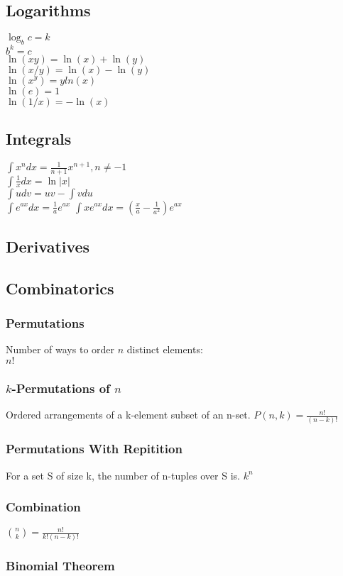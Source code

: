 \subsection*{Logarithms}
$\log_b c=k$\\
$b^k=c$\\
$\ln(xy)=\ln(x)+\ln(y)$\\
$\ln(x/y)=\ln(x)-\ln(y)$\\
$\ln(x^y)=yln(x)$\\
$\ln(e)=1$\\
$\ln(1/x)=-\ln(x)$

\subsection*{Integrals}
$\int x^n dx = \frac{1}{n+1}x^{n+1},n\neq-1$\\
$\int \frac{1}{x} dx = \ln|x|$\\
$\int u dv=uv-\int v du$\\
$\int e^{ax}dx=\frac{1}{a}e^{ax}$
$\int xe^{ax}dx=(\frac{x}{a}-\frac{1}{a^2})e^{ax}$
\subsection*{Derivatives}

\subsection*{Combinatorics}
\subsubsection*{Permutations}
Number of ways to order $n$ distinct elements:\\
$n! $
\subsubsection*{$k$-Permutations of $n$}
Ordered arrangements of a k-element subset of an n-set.
$P(n,k)=\frac{n!}{(n-k)!}$
\subsubsection*{Permutations With Repitition}
For a set S of size k, the number of n-tuples over S is.
$k^n$
\subsubsection*{Combination}
$\binom{n}{k}=\frac{n!}{k!(n-k)!}$
\subsubsection*{Binomial Theorem}



